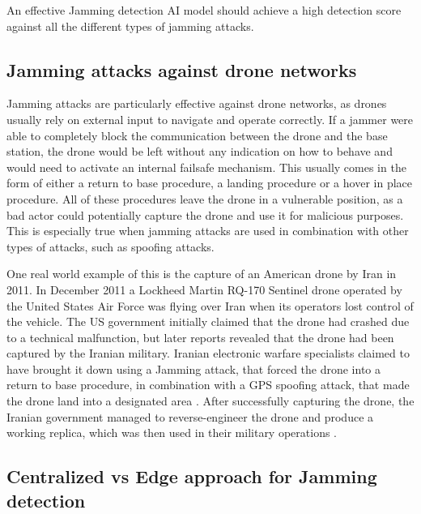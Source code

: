\documentclass[futureinternet,article,submit,pdftex,moreauthors]{Definitions/mdpi}
\begin{document}
An effective Jamming detection AI model should achieve a high detection score against all the different types of jamming attacks.

\subsection{Jamming attacks against drone networks}\label{JammingDroneNetworks}

Jamming attacks are particularly effective against drone networks, as drones usually rely on external input to navigate and operate correctly.
If a jammer were able to completely block the communication between the drone and the base station, the drone would be left without any indication on how to behave and would need to activate an internal failsafe mechanism. 
This usually comes in the form of either a return to base procedure, a landing procedure or a hover in place procedure.
All of these procedures leave the drone in a vulnerable position, as a bad actor could potentially capture the drone and use it for malicious purposes.
This is especially true when jamming attacks are used in combination with other types of attacks, such as spoofing attacks. 

One real world example of this is the capture of an American drone by Iran in 2011. 
In December 2011 a Lockheed Martin RQ-170 Sentinel drone operated by the United States Air Force was flying over Iran when its operators lost control of the vehicle. The US government initially claimed that the drone had crashed due to a technical malfunction, but later reports revealed that the drone had been captured by the Iranian military. 
Iranian electronic warfare specialists claimed to have brought it down using a Jamming attack, that forced the drone into a return to base procedure, in combination with a  GPS spoofing attack, that made the drone land into a designated area \cite{RQ170DroneOwano}. 
After successfully capturing the drone, the Iranian government managed to reverse-engineer the drone and produce a working replica, which was then used in their military operations \cite{IranianUAVGross}.

\subsection{Centralized vs Edge approach for Jamming detection}
\end{document}
